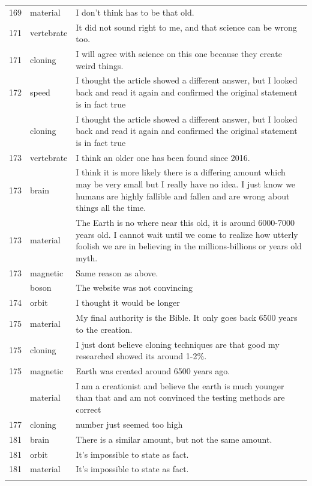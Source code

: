 \documentclass[
  doc,floatsintext]{apa6}
\begin{document}
\begin{longtable}[t]{>{}r>{}l>{\raggedright\arraybackslash}p{30em}}
169 & material & I don't think has to be that old.\\
171 & vertebrate & It did not sound right to me, and that science can be wrong too.\\
171 & cloning & I will agree with science on this one because they  create weird things.\\
172 & speed & I thought the article showed a different answer, but I looked back and read it again and confirmed the original statement is in fact true\\
\addlinespace
172 & cloning & I thought the article showed a different answer, but I looked back and read it again and confirmed the original statement is in fact true\\
173 & vertebrate & I think an older one has been found since 2016.\\
173 & brain & I think it is more likely there is a differing amount which may be very small but I really have no idea. I just know we humans are highly fallible and fallen and are wrong about things all the time.\\
173 & material & The Earth is no where near this old, it is around 6000-7000 years old. I cannot wait until we come to realize how utterly foolish we are in believing in the millions-billions or years old myth.\\
173 & magnetic & Same reason as above.\\
\addlinespace
174 & boson & The website was not convincing\\
174 & orbit & I thought it would be longer\\
175 & material & My final authority is the Bible.  It only goes back 6500 years to the creation.\\
175 & cloning & I just dont believe cloning techniques are that good my researched showed its around 1-2\%.\\
175 & magnetic & Earth was created around 6500 years ago.\\
\addlinespace
177 & material & I am a creationist and believe the earth is much younger than that and am not convinced the testing methods are correct\\
177 & cloning & number just seemed too high\\
181 & brain & There is a similar amount, but not the same amount.\\
181 & orbit & It's impossible to state as fact.\\
181 & material & It's impossible to state as fact.\\
\addlinespace

\end{longtable}
\end{document}
